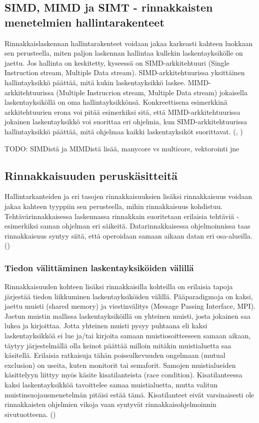 \subsection{SIMD, MIMD ja SIMT - rinnakkaisten menetelmien hallintarakenteet}

Rinnakkaislaskennan hallintarakenteet voidaan jakaa karkeasti kahteen luokkaan sen perusteella,
miten paljon laskennan hallintaa kullekin laskentayksikölle on jaettu. Jos
hallinta on keskitetty, kyseessä on SIMD-arkkitehtuuri (Single Instruction
stream, Multiple Data stream). SIMD-arkkitehtuurissa yksittäinen
hallintayksikkö päättää, mitä kukin laskentayksikkö laskee.
MIMD-arkkitehtuurissa (Multiple Instrucrion stream, Multiple Data stream)
jokaisella laskentayksiköllä on oma hallintayksikkönsä. Konkreettisena
esimerkkinä arkkitehtuurien erona voi pitää esimerkiksi sitä, että
MIMD-arkkitehtuurissa jokainen laskentayksikkö voi suorittaa eri ohjelmia, kun
SIMD-arkkitehtuurissa hallintayksikkö päättää, mitä ohjelmaa kaikki
laskentayksiköt suorittavat. (\citealt{intro}, \citealt{rauber})

TODO: SIMDistä ja MIMDistä lisää, manycore vs multicore, vektorointi jne

\subsection{Rinnakkaisuuden peruskäsitteitä}

Hallintarkanteiden ja eri tasojen rinnakkaisuuksien lisäksi rinnakkaisuus voidaan jakaa
kahteen tyyppiin sen perusteella, mihin rinnakkaisuus kohdistuu.
Tehtävärinnakkaisessa laskennassa rinnakkain suoritetaan erilaisia
tehtäviä - esimerkiksi saman ohjelman eri säikeitä. Datarinnakkaisessa
ohjelmoinnissa taas rinnakkaisuus syntyy siitä, että operoidaan samaan aikaan
datan eri osa-alueilla. (\citealt{intro})

\subsubsection{Tiedon välittäminen laskentayksiköiden välillä}

Rinnakkaisuuden kohteen lisäksi rinnakkaisilla kohteilla on erilaisia tapoja
järjestää tiedon liikkuminen laskentayksiköiden välillä. Pääparadigmoja on
kaksi, jaettu muisti (shared memory) ja viestinvälitys (Message Passing Interface, MPI). Jaetun muistin mallissa
laskentayksiköillä on yhteinen muisti, josta jokainen saa lukea ja kirjoittaa.
Jotta yhteinen muisti pysyy puhtaana eli kaksi laskentayksikköä ei lue ja/tai
kirjoita samaan muistiosoitteeseen samaan aikaan, täytyy järjestelmällä
olla keinot päättää milloin mitäkin muistialuetta saa käsitellä.
Erilaisia ratkaisuja tähän poissulkevuuden ongelmaan (mutual exclusion) on useita, kuten
monitorit tai semaforit. Samojen muistialueiden käsittelyyn
liittyy myös käsite kisatilanteista (race condition). Kisatilanteessa kaksi
laskentayksikköä tavoittelee samaa muistialuetta, mutta valitun
muistinsuojausmenetelmän pitäisi estää tämä. Kisatilanteet eivät varsinaisesti
ole rinnakkaisten ohjelmien vikoja vaan syntyvät rinnakkaisohjelmoinnin
sivutuotteena. (\citealt{ari})

